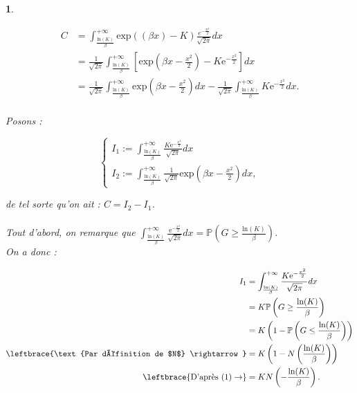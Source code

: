 \documentclass{article}
\theoremstyle{exostyle}
\newtheorem{exercice}{}
\newenvironment{questions}{
\begin{enumerate}[\hspace{12pt} 1.]}{\end{enumerate}}
\begin{document}
\begin{exercice}
\begin{questions}
\begin{align*}
    C &= \int_{\frac{\text{ln}(K)}{\beta}}^{+\infty} \text{exp}((\beta x)-K) \frac{e^{-\frac{x^{2}}{2}}}{\sqrt{2\pi}}dx\\
    &= \frac{1}{\sqrt{2\pi}} \int_{\frac{\text{ln}(K)}{\beta}}^{+\infty} \left[ \text{exp}\left( \beta x - \frac{x^{2}}{2} \right) - K \text{e}^{-\frac{x^{2}}{2}}\right]dx\\
    &= \frac{1}{\sqrt{2\pi}} \int_{\frac{\text{ln}(K)}{\beta}}^{+\infty} \text{exp}\left( \beta x - \frac{x^{2}}{2} \right)dx - \frac{1}{\sqrt{2\pi}} \int_{\frac{\text{ln}(K)}{\beta}}^{+\infty} K \text{e}^{-\frac{x^{2}}{2}}dx.\\
\end{align*}

Posons : 

\[\left\{
  \begin{array}{lll}
    I_{1} := \int_{\frac{\text{ln}(K)}{\beta}}^{+\infty} \frac{K \text{e}^{-\frac{x^{2}}{2}}}{\sqrt{2\pi}}dx\\
    I_{2} := \int_{\frac{\text{ln}(K)}{\beta}}^{+\infty} \frac{1}{\sqrt{2\pi}} \text{exp}\left( \beta x - \frac{x^{2}}{2} \right)dx,
\end{array}
\right.\]

de tel sorte qu'on ait : $C = I_{2}-I_{1}$.\\
\\

Tout d'abord, on remarque que $\int_{\frac{\text{ln}(K)}{\beta}}^{+\infty} \frac{ \text{e}^{-\frac{x^{2}}{2}}}{\sqrt{2\pi}}dx = \mathbb{P}\left(G \geq \frac{\text{ln}(K)}{\beta} \right)$.\\
On a donc : 

\begin{align*}
    I_{1} &= \int_{\frac{\text{ln}(K)}{\beta}}^{+\infty} \frac{K \text{e}^{-\frac{x^{2}}{2}}}{\sqrt{2\pi}}dx\\
    &= K \mathbb{P}\left(G \geq \frac{\text{ln}(K)}{\beta} \right)\\
    &= K \left( 1 - \mathbb{P}\left(G \leq \frac{\text{ln}(K)}{\beta} \right)\right)\\
    \leftbrace{\text{Par définition de $N$} \rightarrow} &= K\left( 1 - N\left( \frac{\text{ln}(K)}{\beta} \right) \right)\\
    \leftbrace{\text{D'après (1)} \rightarrow} &= KN\left( -\frac{\text{ln}(K)}{\beta} \right).
\end{align*}

\bigbreak
\bigbreak


\end{questions}
\end{exercice}
\end{document}
